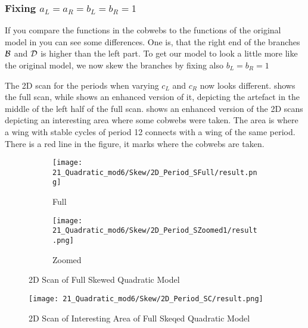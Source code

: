 \subsubsection{Fixing $a_L = a_R = b_L = b_R = 1$}

If you compare the functions in the cobwebs  to the functions of the original model in  you can see some differences.
One is, that the right end of the branches $\mathcal{B}$ and $\mathcal{D}$ is higher than the left part.
To get our model to look a little more like the original model, we now skew the branches by fixing also $b_L = b_R = 1$

The 2D scan for the periods when varying $c_L$ and $c_R$ now looks different.
 shows the full scan, while  shows an enhanced version of it, depicting the artefact in the middle of the left half of the full scan.
 shows an enhanced version of the 2D scans depicting an interesting area where some cobwebs were taken.
The area is where a wing with stable cycles of period 12 connects with a wing of the same period.
There is a red line in the figure, it marks where the cobwebs are taken.

\begin{figure}
    \centering
    \begin{subfigure}{0.4\textwidth}
        \centering
        \texttt{[image: 21\_Quadratic\_mod6/Skew/2D\_Period\_SFull/result.png]}
        \caption{Full}
        \label{fig:quadratic.full.skew.2d.full}
    \end{subfigure}
    \begin{subfigure}{0.4\textwidth}
        \centering
        \texttt{[image: 21\_Quadratic\_mod6/Skew/2D\_Period\_SZoomed1/result.png]}
        \caption{Zoomed}
        \label{fig:quadratic.full.skew.2d.z1}
    \end{subfigure}
    \caption{2D Scan of Full Skewed Quadratic Model}
\end{figure}

\begin{figure}
    \centering
    \texttt{[image: 21\_Quadratic\_mod6/Skew/2D\_Period\_SC/result.png]}
    \caption{2D Scan of Interesting Area of Full Skeqed Quadratic Model}
    \label{fig:quadratic.full.skew.2d.c}
\end{figure}

